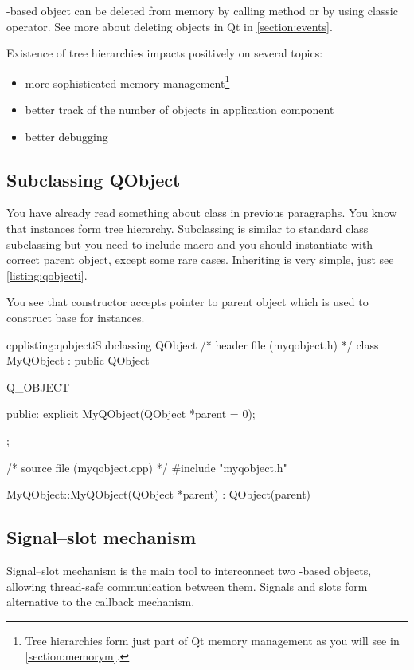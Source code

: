 \indent{}-based object can be deleted from memory by calling method or by using classic operator. See more about deleting objects in Qt in \autoref{section:events}.

Existence of tree hierarchies impacts positively on several topics:
\begin{itemize}
\item more sophisticated memory management\footnote{Tree hierarchies form just part of Qt memory management as you will see in \autoref{section:memorym}.}
\item better track of the number of objects in application component
\item better debugging
\end{itemize}

\subsection{Subclassing QObject}
You have already read something about class in previous paragraphs. You know that instances form tree hierarchy. Subclassing is similar to standard \cpp class subclassing but you need to include macro and you should instantiate with correct parent object, except some rare cases. Inheriting is very simple, just see \autoref{listing:qobjecti}.

You see that constructor accepts pointer to parent object which is used to construct base for instances.

\begin{fdoccode}{cpp}{listing:qobjecti}{Subclassing QObject}
/* header file (myqobject.h) */
class MyQObject : public QObject {
	Q_OBJECT
	
    public:
		explicit MyQObject(QObject *parent = 0);
};

/* source file (myqobject.cpp) */
#include "myqobject.h"


MyQObject::MyQObject(QObject *parent) : QObject(parent) {
}
\end{fdoccode}

\subsection{Signal--slot mechanism}
Signal--slot mechanism is the main tool to interconnect two -based objects, allowing thread-safe communication between them. Signals and slots form alternative to the callback mechanism. 

